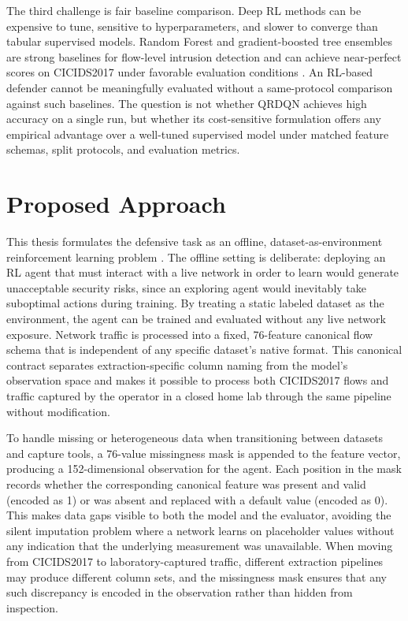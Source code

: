 The third challenge is fair baseline comparison. Deep RL methods can be expensive to tune, sensitive to hyperparameters, and slower to converge than tabular supervised models. Random Forest and gradient-boosted tree ensembles are strong baselines for flow-level intrusion detection and can achieve near-perfect scores on CICIDS2017 under favorable evaluation conditions \parencite{LiuLang2019IDSSurvey,Apruzzese2022CrossEvaluationNIDS}. An RL-based defender cannot be meaningfully evaluated without a same-protocol comparison against such baselines. The question is not whether QRDQN achieves high accuracy on a single run, but whether its cost-sensitive formulation offers any empirical advantage over a well-tuned supervised model under matched feature schemas, split protocols, and evaluation metrics.

\section{Proposed Approach}
This thesis formulates the defensive task as an offline, dataset-as-environment reinforcement learning problem \parencite{Levine2020OfflineRL}. The offline setting is deliberate: deploying an RL agent that must interact with a live network in order to learn would generate unacceptable security risks, since an exploring agent would inevitably take suboptimal actions during training. By treating a static labeled dataset as the environment, the agent can be trained and evaluated without any live network exposure. Network traffic is processed into a fixed, 76-feature canonical flow schema that is independent of any specific dataset's native format. This canonical contract separates extraction-specific column naming from the model's observation space and makes it possible to process both CICIDS2017 flows and traffic captured by the operator in a closed home lab through the same pipeline without modification.

To handle missing or heterogeneous data when transitioning between datasets and capture tools, a 76-value missingness mask is appended to the feature vector, producing a 152-dimensional observation for the agent. Each position in the mask records whether the corresponding canonical feature was present and valid (encoded as 1) or was absent and replaced with a default value (encoded as 0). This makes data gaps visible to both the model and the evaluator, avoiding the silent imputation problem where a network learns on placeholder values without any indication that the underlying measurement was unavailable. When moving from CICIDS2017 to laboratory-captured traffic, different extraction pipelines may produce different column sets, and the missingness mask ensures that any such discrepancy is encoded in the observation rather than hidden from inspection.

